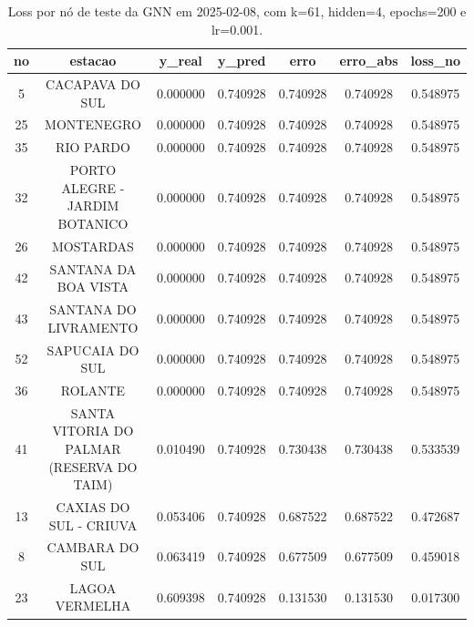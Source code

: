 \begin{table}[h]
\centering
\caption{Loss por nó de teste da GNN em 2025-02-08, com k=61, hidden=4, epochs=200 e lr=0.001.}
\label{tab:gnn_loss_nodes_k61_hidden4}
\begin{tabular}{ccccccc}
\toprule
no & estacao & y\_real & y\_pred & erro & erro\_abs & loss\_no \\
\midrule
5 & CACAPAVA DO SUL & 0.000000 & 0.740928 & 0.740928 & 0.740928 & 0.548975 \\
25 & MONTENEGRO & 0.000000 & 0.740928 & 0.740928 & 0.740928 & 0.548975 \\
35 & RIO PARDO & 0.000000 & 0.740928 & 0.740928 & 0.740928 & 0.548975 \\
32 & PORTO ALEGRE - JARDIM BOTANICO & 0.000000 & 0.740928 & 0.740928 & 0.740928 & 0.548975 \\
26 & MOSTARDAS & 0.000000 & 0.740928 & 0.740928 & 0.740928 & 0.548975 \\
42 & SANTANA DA BOA VISTA & 0.000000 & 0.740928 & 0.740928 & 0.740928 & 0.548975 \\
43 & SANTANA DO LIVRAMENTO & 0.000000 & 0.740928 & 0.740928 & 0.740928 & 0.548975 \\
52 & SAPUCAIA DO SUL & 0.000000 & 0.740928 & 0.740928 & 0.740928 & 0.548975 \\
36 & ROLANTE & 0.000000 & 0.740928 & 0.740928 & 0.740928 & 0.548975 \\
41 & SANTA VITORIA DO PALMAR (RESERVA DO TAIM) & 0.010490 & 0.740928 & 0.730438 & 0.730438 & 0.533539 \\
13 & CAXIAS DO SUL - CRIUVA & 0.053406 & 0.740928 & 0.687522 & 0.687522 & 0.472687 \\
8 & CAMBARA DO SUL & 0.063419 & 0.740928 & 0.677509 & 0.677509 & 0.459018 \\
23 & LAGOA VERMELHA & 0.609398 & 0.740928 & 0.131530 & 0.131530 & 0.017300 \\
\bottomrule
\end{tabular}
\end{table}
